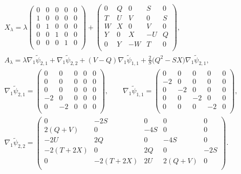 \documentclass[pdftex]{sigma}
\numberwithin{equation}{section}
\begin{document}
\begin{gather*}
X_\lambda = \lambda \left(
\begin{matrix}
0 & 0 & 0 & 0 & 0 \\
1 & 0 & 0 & 0 & 0 \\
0 & 1 & 0 & 0 & 0 \\
0 & 0 & 1 & 0 & 0 \\
0 & 0 & 0 & 1 & 0 \\
\end{matrix}
\right) + \left(
\begin{matrix}
0 & Q & 0 & S & 0 \\
T & U & V & 0 & S \\
W & X & 0 & V & 0 \\
Y & 0 & X & -U & Q \\
0 & Y & -W & T & 0 \\
\end{matrix}
\right), \\
 A_\lambda = \lambda \nabla _1\widetilde{\psi}_{2,1}+\nabla _1\widetilde{\psi}_{2,2}
 +(V-Q) \nabla _1\widetilde{\psi}_{1,1} + \frac{2}{S}\big(Q^2-SX\big) \nabla _1\widetilde{\psi}_{2,1}, \\
\nabla _1\widetilde{\psi}_{2,1} = \left(
\begin{matrix}
0 & 0 & 0 & 0 & 0 \\
0 & 0 & 0 & 0 & 0 \\
0 & 0 & 0 & 0 & 0 \\
-2 & 0 & 0 & 0 & 0 \\
0 & -2 & 0 & 0 & 0 \\
\end{matrix}
\right),\qquad \nabla _1\widetilde{\psi}_{1,1}
= \left(
\begin{matrix}
0 & 0 & 0 & 0 & 0 \\
-2 & 0 & 0 & 0 & 0 \\
0 & -2 & 0 & 0 & 0 \\
0 & 0 & -2 & 0 & 0 \\
0 & 0 & 0 & -2 & 0 \\
\end{matrix}
\right), \\
 \nabla _1\widetilde{\psi}_{2,2}=\left(
\begin{matrix}
0&-2S &0 &0 &0 \\
2(Q+V)& 0 &-4S &0 &0 \\
-2U&2Q &0 &-4S &0 \\
-2(T+2X)&0 &2Q &0 &-2S \\
0&-2(T+2X) &2U &2(Q+V) &0 \\
\end{matrix}
\right).
\end{gather*}
\end{document}
